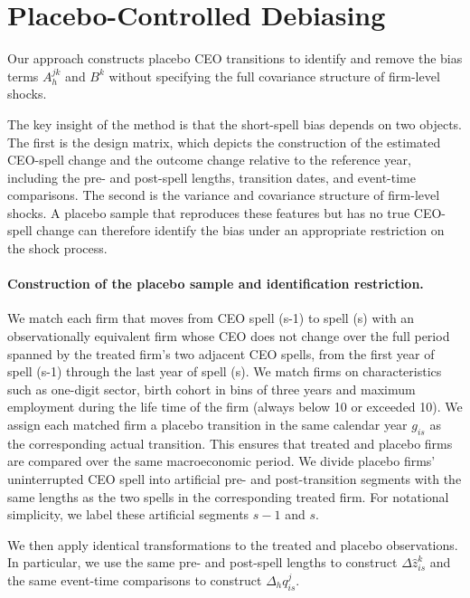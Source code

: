 \documentclass[11pt,a4paper]{article}
\begin{document}
\section{Placebo-Controlled Debiasing}\label{sec:placebo_debiasing}

Our approach constructs placebo CEO transitions to identify and remove
the bias terms $A_h^{jk}$ and $B^k$ without specifying the full
covariance structure of firm-level shocks. 

The key insight of the method is that the short-spell bias depends on two objects. The first is the design matrix, which depicts the construction of the estimated CEO-spell change and the outcome change relative to the reference year, including the pre- and post-spell lengths, transition dates, and event-time comparisons. The second is the variance and covariance structure of firm-level shocks. A placebo sample that reproduces these features but has no true CEO-spell change can therefore identify the bias under an appropriate restriction on the shock process.

\paragraph{Construction of the placebo sample and identification restriction.}
We match each firm that moves from CEO spell (s-1) to spell (s) with an observationally equivalent firm whose CEO does not change over the full period spanned by the treated firm’s two adjacent CEO spells, from the first year of spell (s-1) through the last year of spell (s). We match firms on characteristics such as one-digit sector, birth cohort in bins of three years and maximum employment during the life time of the firm (always below 10 or exceeded 10). We assign each matched firm a placebo transition in the same calendar year $g_{is}$ as the corresponding actual transition. This ensures that treated and placebo firms are compared over the same macroeconomic period. We divide placebo firms' uninterrupted CEO spell into artificial pre- and post-transition segments with the same lengths as the two spells in the corresponding treated firm. For notational simplicity, we label
these artificial segments $s-1$ and $s$.

We then apply identical transformations to the treated and placebo observations. In particular, we use the same pre- and post-spell lengths to construct $\Delta\widehat z_{is}^k$ and the same event-time comparisons to construct $\Delta_h q_{is}^j$. 
\end{document}
